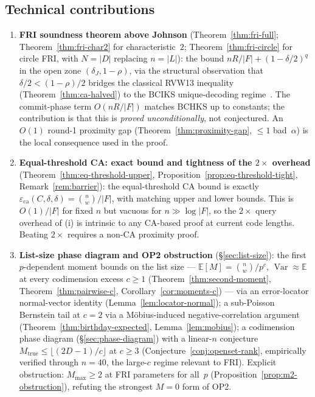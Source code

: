 \documentclass[11pt]{article}
\newcommand{\EE}{\mathbb{E}}
\DeclareMathOperator{\Var}{Var}
\begin{document}
\subsection{Technical contributions}

\begin{enumerate}[label=(\roman*)]
\item \textbf{FRI soundness theorem above Johnson} (Theorem~\ref{thm:fri-full}; Theorem~\ref{thm:fri-char2} for characteristic~$2$; Theorem~\ref{thm:fri-circle} for circle FRI, with $N = |D|$ replacing $n = |L|$): the bound $nR/|F| + (1{-}\delta/2)^q$ in the open zone $(\delta_J, 1{-}\rho)$, via the structural observation that $\delta/2 < (1{-}\rho)/2$ bridges the classical RVW13 inequality~\cite{RVW} (Theorem~\ref{thm:ca-halved}) to the BCIKS unique-decoding regime~\cite{BCIKS}.  The commit-phase term $O(nR/|F|)$ matches BCHKS up to constants; the contribution is that this is \emph{proved unconditionally}, not conjectured.  An $O(1)$ round-1 proximity gap (Theorem~\ref{thm:proximity-gap}, $\leq 1$ bad~$\alpha$) is the local consequence used in the proof.

\item \textbf{Equal-threshold CA: exact bound and tightness of the $2{\times}$ overhead} (Theorem~\ref{thm:eq-threshold-upper}, Proposition~\ref{prop:eq-threshold-tight}, Remark~\ref{rem:barrier}): the equal-threshold CA bound is exactly $\varepsilon_{\mathrm{ca}}(C,\delta,\delta) = \binom{n}{w}/|F|$, with matching upper and lower bounds.  This is $O(1)/|F|$ for fixed $n$ but vacuous for $n \gg \log|F|$, so the $2{\times}$ query overhead of (i) is intrinsic to any CA-based proof at current code lengths.  Beating $2{\times}$ requires a non-CA proximity proof.

\item \textbf{List-size phase diagram and OP2 obstruction} (\S\ref{sec:list-size}): the first $p$-dependent moment bounds on the list size --- $\EE[M] = \binom{n}{w}/p^c$, $\Var \approx \EE$ at every codimension excess $c \geq 1$ (Theorem~\ref{thm:second-moment}, Theorem~\ref{thm:pairwise-c}, Corollary~\ref{cor:moments-c}) --- via an error-locator normal-vector identity (Lemma~\ref{lem:locator-normal}); a sub-Poisson Bernstein tail at $c{=}2$ via a M\"obius-induced negative-correlation argument (Theorem~\ref{thm:birthday-expected}, Lemma~\ref{lem:mobius}); a codimension phase diagram (\S\ref{sec:phase-diagram}) with a linear-$n$ conjecture $M_{\mathrm{true}} \leq \lfloor(2D{-}1)/c\rfloor$ at $c \geq 3$ (Conjecture~\ref{conj:openset-rank}, empirically verified through $n = 40$, the large-$c$ regime relevant to FRI).  Explicit obstruction: $M_{\max} \geq 2$ at FRI parameters for all~$p$ (Proposition~\ref{prop:m2-obstruction}), refuting the strongest $M = 0$ form of OP2.


\end{enumerate}
\end{document}
